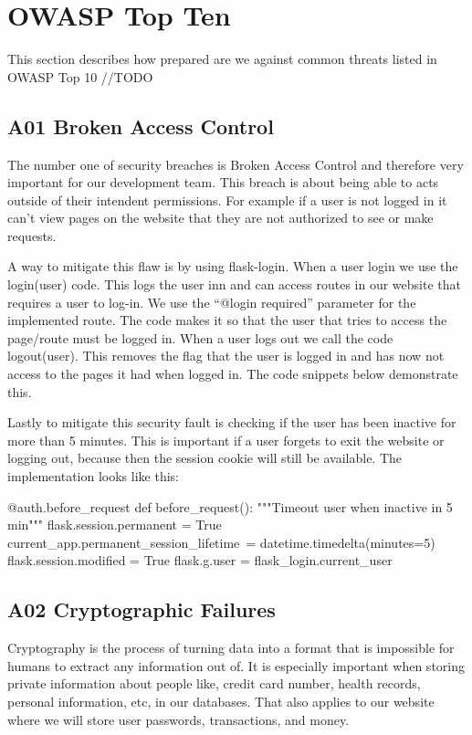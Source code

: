
\chapter{OWASP Top Ten
}\label{kap:owasptopten}

This section describes how prepared are we against common threats listed in OWASP Top 10 //TODO


\section{A01 Broken Access Control}

The number one of security breaches is Broken Access Control and therefore very important for our development team. This breach is about being able to acts outside of their intendent permissions. For example if a user is not logged in it can’t view pages on the website that they are not authorized to see or make requests. 

A way to mitigate this flaw is by using flask-login. When a user login we use the login(user) code. This logs the user inn and can access routes in our website that requires a user to log-in. We use the “@login required” parameter for the implemented route. The code makes it so that the user that tries to access the page/route must be logged in. When a user logs out we call the code logout(user). This removes the flag that the user is logged in and has now not access to the pages it had when logged in. The code snippets below demonstrate this. 

Lastly to mitigate this security fault is checking if the user has been inactive for more than 5 minutes. This is important if a user forgets to exit the website or logging out, because then the session cookie will still be available. The implementation looks like this:

\begin{python}
@auth.before_request
def before_request():
    """Timeout user when inactive in 5 min"""
    flask.session.permanent = True
    current_app.permanent_session_lifetime\
        = datetime.timedelta(minutes=5)
    flask.session.modified = True
    flask.g.user = flask_login.current_user
\end{python}

\section{A02 Cryptographic Failures}
Cryptography is the process of turning data into a format that is impossible for humans to extract any information out of. It is especially important when storing private information about people like, credit card number, health records, personal information, etc, in our databases. That also applies to our website where we will store user passwords, transactions, and money.
